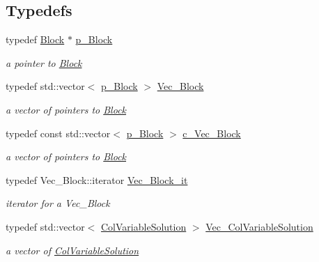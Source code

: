 \subsection*{Typedefs}
\begin{DoxyCompactItemize}
\item 
typedef \mbox{\hyperlink{class_s_m_spp__di__unipi__it_1_1_block}{Block}} $\ast$ \mbox{\hyperlink{group___block___t_y_p_e_s_ga753932d88360bdd26edd3ad0397c99f9}{p\+\_\+\+Block}}
\begin{DoxyCompactList}\small\item\em a pointer to \mbox{\hyperlink{class_s_m_spp__di__unipi__it_1_1_block}{Block}} \end{DoxyCompactList}\item 
typedef std\+::vector$<$ \mbox{\hyperlink{group___block___t_y_p_e_s_ga753932d88360bdd26edd3ad0397c99f9}{p\+\_\+\+Block}} $>$ \mbox{\hyperlink{group___block___t_y_p_e_s_gaf2535d74ac0260546452f729dcc5b9f3}{Vec\+\_\+\+Block}}
\begin{DoxyCompactList}\small\item\em a vector of pointers to \mbox{\hyperlink{class_s_m_spp__di__unipi__it_1_1_block}{Block}} \end{DoxyCompactList}\item 
typedef const std\+::vector$<$ \mbox{\hyperlink{group___block___t_y_p_e_s_ga753932d88360bdd26edd3ad0397c99f9}{p\+\_\+\+Block}} $>$ \mbox{\hyperlink{group___block___t_y_p_e_s_ga7cbe2d2777d0b63cf75c041bf7e60dff}{c\+\_\+\+Vec\+\_\+\+Block}}
\begin{DoxyCompactList}\small\item\em a vector of pointers to \mbox{\hyperlink{class_s_m_spp__di__unipi__it_1_1_block}{Block}} \end{DoxyCompactList}\item 
typedef Vec\+\_\+\+Block\+::iterator \mbox{\hyperlink{group___block___t_y_p_e_s_ga106f39b1bd552b44399d6c3484e5d6bd}{Vec\+\_\+\+Block\+\_\+it}}
\begin{DoxyCompactList}\small\item\em iterator for a Vec\+\_\+\+Block \end{DoxyCompactList}\item 
typedef std\+::vector$<$ \mbox{\hyperlink{class_s_m_spp__di__unipi__it_1_1_col_variable_solution}{Col\+Variable\+Solution}} $>$ \mbox{\hyperlink{group___col_variable_solution___t_y_p_e_s_gad843ca4ba6da2f653bbc07a62a8c49dd}{Vec\+\_\+\+Col\+Variable\+Solution}}
\begin{DoxyCompactList}\small\item\em a vector of \mbox{\hyperlink{class_s_m_spp__di__unipi__it_1_1_col_variable_solution}{Col\+Variable\+Solution}} \end{DoxyCompactList}\item 

\end{DoxyCompactItemize}
